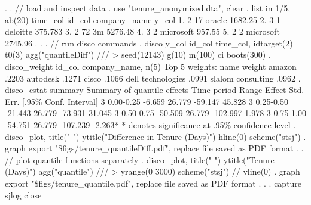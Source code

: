 . 
. // load and inspect data
. use "tenure_anonymized.dta", clear 
{\smallskip}
. list in 1/5, ab(20) 
{\smallskip}
     {\TLC}
     {\VBAR} time_col   id_col   company_name     y_col {\VBAR}
     {\LFTT}
  1. {\VBAR}        2       17         oracle   1682.25 {\VBAR}
  2. {\VBAR}        3        1       deloitte   375.783 {\VBAR}
  3. {\VBAR}        2       72             3m   5276.48 {\VBAR}
  4. {\VBAR}        3        2      microsoft    957.55 {\VBAR}
  5. {\VBAR}        2        2      microsoft   2745.96 {\VBAR}
     {\BLC}
{\smallskip}
. 
. 
. // run disco commands
. disco y_col id_col time_col, idtarget(2) t0(3) agg("quantileDiff") ///
>         seed(12143) g(10) m(100) ci boots(300) 
{\smallskip}
. disco_weight id_col company_name, n(5)
{\smallskip}
Top 5 weights:
{\smallskip}
  {\TLC}
  {\VBAR}              name {\VBAR} weight {\VBAR}
  {\LFTT}
  {\VBAR}            amazon {\VBAR}  .2203 {\VBAR}
  {\VBAR}          autodesk {\VBAR}  .1271 {\VBAR}
  {\VBAR}             cisco {\VBAR}  .1066 {\VBAR}
  {\VBAR} dell technologies {\VBAR}  .0991 {\VBAR}
  {\VBAR} slalom consulting {\VBAR}  .0962 {\VBAR}
  {\BLC}
{\smallskip}
. disco_estat summary
{\smallskip}
Summary of quantile effects
Time period   Range                    Effect     Std. Err.    [.95\% Conf. Interval]
        3    0.00-0.25       -6.659       26.779      -59.147     45.828
        3    0.25-0.50      -21.443       26.779      -73.931     31.045
        3    0.50-0.75      -50.509       26.779     -102.997      1.978
        3    0.75-1.00      -54.751       26.779     -107.239     -2.263*
* denotes significance at .95\% confidence level
{\smallskip}
. disco_plot, title(" ") ytitle("Difference in Tenure (Days)") hline(0) scheme("stsj")
{\smallskip}
. graph export "\${\lbr}figs{\rbr}/tenure_quantileDiff.pdf", replace
file{}
    {} saved as PDF format
{\smallskip}
. 
. // plot quantile functions separately
. disco_plot, title(" ") ytitle("Tenure (Days)") agg("quantile") /// 
>         yrange(0 3000) scheme("stsj") // vline(0)
{\smallskip}
. graph export "\${\lbr}figs{\rbr}/tenure_quantile.pdf", replace
file{}
    {} saved as PDF format
{\smallskip}
. 
. 
. capture sjlog close
{\smallskip}
